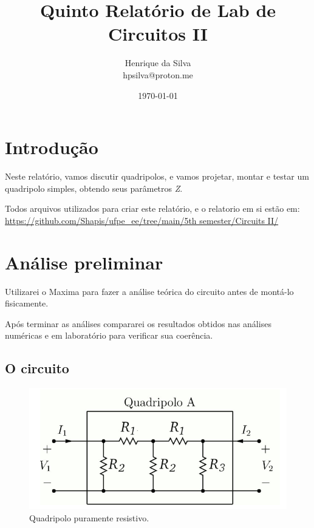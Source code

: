 \documentclass[12pt,twoside, a4paper, twocolumn]{article}
\title{Quinto Relatório de Lab de Circuitos II}
\author{Henrique da Silva \\ hpsilva@proton.me}
\date{\today}
\begin{document}
\maketitle
{}
\newpage
\tableofcontents
\newpage


\section{Introdução}


Neste relatório, vamos discutir quadripolos, e vamos projetar, montar e testar um quadripolo simples, obtendo seus parâmetros \emph{Z}.




Todos arquivos utilizados para criar este relatório, e o relatorio em si estão em:  \url{https://github.com/Shapis/ufpe_ee/tree/main/5th semester/Circuits II/}


\section{Análise preliminar}


Utilizarei o Maxima para fazer a análise teórica do circuito antes de montá-lo fisicamente.




Após terminar as análises compararei os resultados obtidos nas análises numéricas e em laboratório para verificar sua coerência.


\subsection{O circuito}


\begin{figure}[h]
    \centering
    \includegraphics[width=1\columnwidth]{images/circuito.png}
    \caption{Quadripolo puramente resistivo.}
\end{figure}
\end{document}
